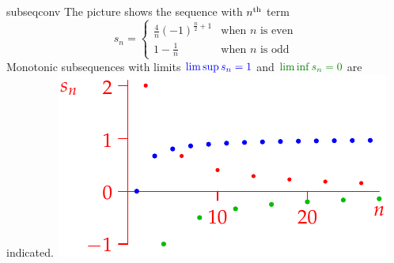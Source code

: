 \begin{example}[lower separated=false, sidebyside, sidebyside align=top seam, sidebyside gap=0pt, righthand width=0.47\linewidth]{}{subseqconv}
	The picture shows the sequence with $n\textsuperscript{th}$ term
	\[
		s_n=
		\begin{cases}
			\frac 4n(-1)^{\frac n2+1}&\text{when $n$ is even}\\
			1-\frac 1{n}&\text{when $n$ is odd}
		\end{cases}
	\]
	Monotonic subsequences with limits $\textcolor{blue}{\limsup s_n=1}$ and $\textcolor{Green}{\liminf s_n=0}$ are indicated.
	\tcblower
	\hfill\includegraphics[scale=1]{exlimsupconv2}
\end{example}

